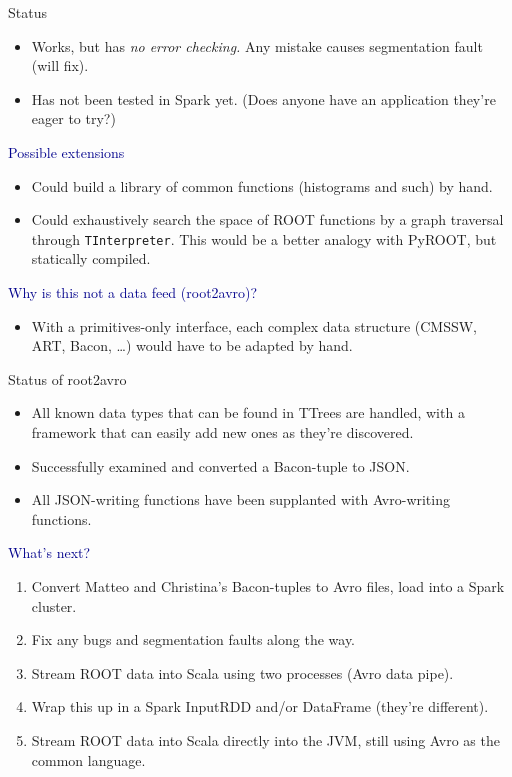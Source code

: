 \documentclass{beamer}
\begin{document}
\begin{frame}{Status}
\begin{itemize}
\item Works, but has {\it no error checking.} Any mistake causes segmentation fault (will fix).
\item Has not been tested in Spark yet. (Does anyone have an application they're eager to try?)
\end{itemize}

\vfill
\vfill
\hspace{-0.83 cm} \textcolor{darkblue}{\Large Possible extensions}
\begin{itemize}
\item Could build a library of common functions (histograms and such) by hand.
\item Could exhaustively search the space of ROOT functions by a graph traversal through {\tt TInterpreter}. This would be a better analogy with PyROOT, but statically compiled.
\end{itemize}

\vfill
\vfill
\hspace{-0.83 cm} \textcolor{darkblue}{\Large Why is this not a data feed (root2avro)?}
\begin{itemize}
\item With a primitives-only interface, each complex data structure (CMSSW, ART, Bacon, \ldots) would have to be adapted by hand.
\end{itemize}
\end{frame}

\begin{frame}{Status of root2avro}
\begin{itemize}
\item All known data types that can be found in TTrees are handled, with a framework that can easily add new ones as they're discovered.
\item Successfully examined and converted a Bacon-tuple to JSON.
\item All JSON-writing functions have been supplanted with Avro-writing functions.
\end{itemize}

\vfill
\vfill
\hspace{-0.83 cm} \textcolor{darkblue}{\Large What's next?}
\begin{enumerate}
\item Convert Matteo and Christina's Bacon-tuples to Avro files, load into a Spark cluster.
\item Fix any bugs and segmentation faults along the way.
\item Stream ROOT data into Scala using two processes (Avro data pipe).
\item Wrap this up in a Spark InputRDD and/or DataFrame (they're different).
\item Stream ROOT data into Scala directly into the JVM, still using Avro as the common language.
\end{enumerate}
\end{frame}
\end{document}
